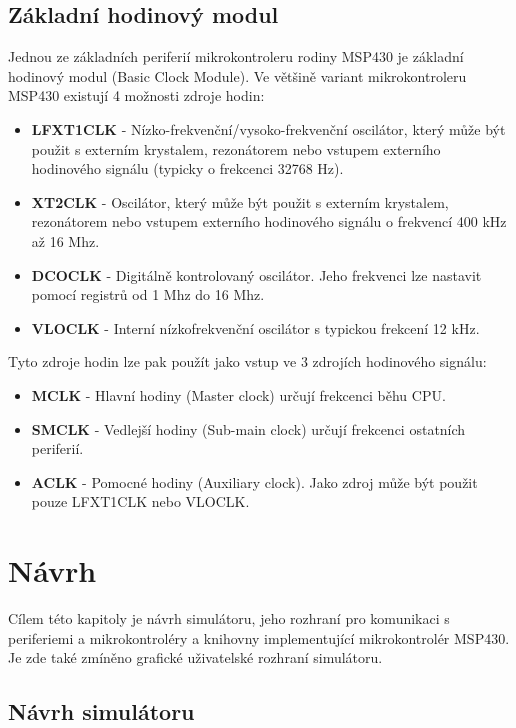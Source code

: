 \section{Základní hodinový modul}

Jednou ze základních periferií mikrokontroleru rodiny MSP430 je základní hodinový modul (Basic Clock Module). Ve většině variant mikrokontroleru MSP430
existují 4 možnosti zdroje hodin:

\begin{itemize}
\item \textbf{LFXT1CLK} - Nízko-frekvenční/vysoko-frekvenční oscilátor, který může být použit s externím krystalem, rezonátorem nebo vstupem externího hodinového signálu (typicky o frekcenci 32768 Hz).
\item \textbf{XT2CLK} - Oscilátor, který může být použit s externím krystalem, rezonátorem nebo vstupem externího hodinového signálu o frekvencí 400 kHz až 16 Mhz.
\item \textbf{DCOCLK} - Digitálně kontrolovaný oscilátor. Jeho frekvenci lze nastavit pomocí registrů od 1 Mhz do 16 Mhz.
\item \textbf{VLOCLK} - Interní nízkofrekvenční oscilátor s typickou frekcení 12 kHz.
\end{itemize}

Tyto zdroje hodin lze pak použít jako vstup ve 3 zdrojích hodinového signálu:

\begin{itemize}
\item \textbf{MCLK} - Hlavní hodiny (Master clock) určují frekcenci běhu CPU.
\item \textbf{SMCLK} - Vedlejší hodiny (Sub-main clock) určují frekcenci ostatních periferií.
\item \textbf{ACLK} - Pomocné hodiny (Auxiliary clock). Jako zdroj může být použit pouze LFXT1CLK nebo VLOCLK.
\end{itemize}

\chapter{Návrh}
\label{navrh}

Cílem této kapitoly je návrh simulátoru, jeho rozhraní pro komunikaci s periferiemi a mikrokontroléry a knihovny implementující mikrokontrolér MSP430.
Je zde také zmíněno grafické uživatelské rozhraní simulátoru.

\section{Návrh simulátoru}

